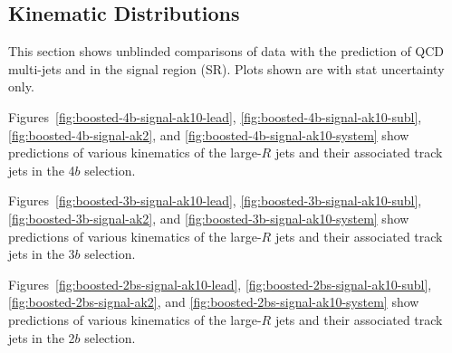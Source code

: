 \begin{figure*}[htbp!]
\begin{center}
  \caption{Scaled dijet mass distribution in the 2$b$s Signal Region after unblinding. The left plot is on linear scale and the right plot is on log scale. Stat uncertainty and systematic ucnertainties are shown on the plot.}
  \label{fig:boosted-2b-signal-pole}
\end{center}
\end{figure*}

\clearpage
\subsection{Kinematic Distributions}
This section shows unblinded comparisons of data with the prediction of QCD multi-jets and \ttbar in the signal region (SR). Plots shown are with stat uncertainty only.

Figures~\ref{fig:boosted-4b-signal-ak10-lead}, \ref{fig:boosted-4b-signal-ak10-subl}, \ref{fig:boosted-4b-signal-ak2}, and \ref{fig:boosted-4b-signal-ak10-system} show predictions of various kinematics of the large-$R$ jets and their associated track jets in the 4$b$ selection.

Figures~\ref{fig:boosted-3b-signal-ak10-lead}, \ref{fig:boosted-3b-signal-ak10-subl}, \ref{fig:boosted-3b-signal-ak2}, and \ref{fig:boosted-3b-signal-ak10-system} show predictions of various kinematics of the large-$R$ jets and their associated track jets in the 3$b$ selection.

Figures~\ref{fig:boosted-2bs-signal-ak10-lead}, \ref{fig:boosted-2bs-signal-ak10-subl}, \ref{fig:boosted-2bs-signal-ak2}, and \ref{fig:boosted-2bs-signal-ak10-system} show predictions of various kinematics of the large-$R$ jets and their associated track jets in the 2$b$ selection.

\begin{figure*}[htbp!]
\begin{center}
  \caption{Kinematics of the lead large-$R$ jet in data and prediction in the signal region after requiring 4 $b$-tags. }
  \label{fig:boosted-4b-signal-ak10-lead}
\end{center}
\end{figure*}

